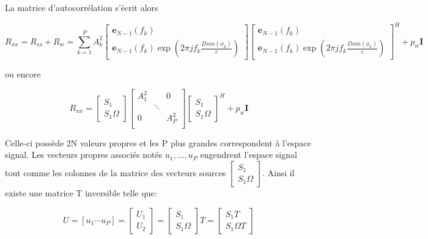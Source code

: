 \documentclass{article}
\begin{document}
La matrice d'autocorrélation s'écrit alors 

\begin{equation}
R_{xx} = R_{ss} + R_w =\sum_{k=1}^{P}A_k^2 \begin{bmatrix} \boldsymbol{e}_{N-1}(f_k) \\ \boldsymbol{e}_{N-1}(f_k) \exp(2\pi j f_k \frac{D sin(\phi_k) }{c}) \end{bmatrix} \begin{bmatrix} \boldsymbol{e}_{N-1}(f_k) \\ \boldsymbol{e}_{N-1}(f_k) \exp(2\pi j f_k \frac{D sin(\phi_k) }{c}) \end{bmatrix}^H + p_w\boldsymbol{I}
\end{equation}

\vspace*{20pt}

ou encore

\begin{equation}
R_{xx} = \begin{bmatrix} S_1 \\ S_1 \Omega \end{bmatrix} 
\begin{bmatrix} A_1^2 & & \text{0}\\ &  \ddots \\ \text{0} & & A_P^2 \\ \end{bmatrix}
\begin{bmatrix}   S_1 \\ S_1 \Omega \end{bmatrix}^H  + p_w\boldsymbol{I}
\end{equation}

Celle-ci possède 2N valeurs propres et les P plus grandes correspondent à l'espace signal.
Les vecteurs propres associés notés \( u_1, ..., u_P \) engendrent l'espace signal tout comme les colonnes de la matrice des vecteurs sources \( \begin{bmatrix} S_1 \\ S_1 \Omega \end{bmatrix} \).
Ainsi il existe une matrice T inversible telle que:

\begin{equation}
U = [u_1 \cdots u_P] = \begin{bmatrix} U_1 \\ U_2 \end{bmatrix} = \begin{bmatrix} S_1 \\ S_1 \Omega \end{bmatrix} T = \begin{bmatrix} S_1 T \\ S_1 \Omega T \end{bmatrix}
\end{equation}
\end{document}
